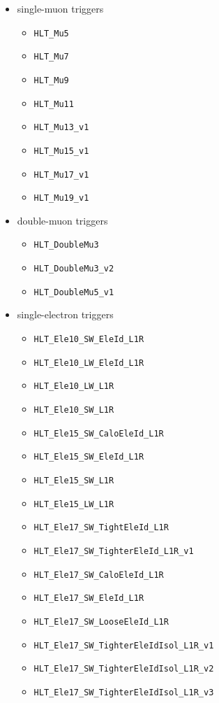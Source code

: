 \begin{itemize}
\item single-muon triggers
  \begin{itemize}
  \item \verb=HLT_Mu5=
  \item \verb=HLT_Mu7=       
  \item \verb=HLT_Mu9=        
  \item \verb=HLT_Mu11=      
  \item \verb=HLT_Mu13_v1=    
  \item \verb=HLT_Mu15_v1=    
  \item \verb=HLT_Mu17_v1=    
  \item \verb=HLT_Mu19_v1=    
  \end{itemize}
\item double-muon triggers
  \begin{itemize}
  \item \verb=HLT_DoubleMu3=
  \item \verb=HLT_DoubleMu3_v2=
  \item \verb=HLT_DoubleMu5_v1=
  \end{itemize}
\item single-electron triggers
  \begin{itemize}
  \item \verb=HLT_Ele10_SW_EleId_L1R=
  \item \verb=HLT_Ele10_LW_EleId_L1R=
  \item \verb=HLT_Ele10_LW_L1R=
  \item \verb=HLT_Ele10_SW_L1R=
  \item \verb=HLT_Ele15_SW_CaloEleId_L1R=
  \item \verb=HLT_Ele15_SW_EleId_L1R=
  \item \verb=HLT_Ele15_SW_L1R=
  \item \verb=HLT_Ele15_LW_L1R=
  \item \verb=HLT_Ele17_SW_TightEleId_L1R=
  \item \verb=HLT_Ele17_SW_TighterEleId_L1R_v1=
  \item \verb=HLT_Ele17_SW_CaloEleId_L1R=
  \item \verb=HLT_Ele17_SW_EleId_L1R=
  \item \verb=HLT_Ele17_SW_LooseEleId_L1R=
  \item \verb=HLT_Ele17_SW_TighterEleIdIsol_L1R_v1=
  \item \verb=HLT_Ele17_SW_TighterEleIdIsol_L1R_v2=
  \item \verb=HLT_Ele17_SW_TighterEleIdIsol_L1R_v3=

\end{itemize}
\end{itemize}
